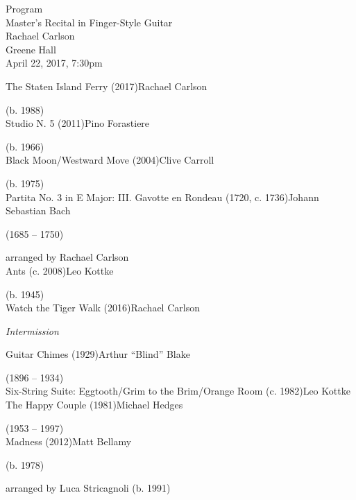 \documentclass{tufte-handout}
\begin{document}
\begin{fullwidth}
\begin{center}
  Program\\
  Master's Recital in Finger-Style Guitar\\
  Rachael Carlson\\
  Greene Hall\\
  April 22, 2017, 7:30pm
\end{center}
\noindent The Staten Island Ferry (2017)\dotfill Rachael Carlson\\
\strut\hfill (b. 1988)\\

\noindent Studio N. 5 (2011)\dotfill Pino Forastiere\\
\strut\hfill (b. 1966)\\

\noindent Black Moon/Westward Move (2004)\dotfill Clive Carroll\\
\strut \hfill (b. 1975)\\

\noindent Partita No. 3 in E Major: III. Gavotte en Rondeau (1720, c. 1736)\dotfill Johann Sebastian Bach\\
\strut \hfill (1685 -- 1750)\\
\strut\hfill arranged by Rachael Carlson\\

\noindent Ants (c. 2008)\dotfill Leo Kottke\\
\strut\hfill (b. 1945)\\

\noindent Watch the Tiger Walk (2016)\dotfill Rachael Carlson\\

\begin{center}
  \emph{Intermission}
\end{center}

\noindent Guitar Chimes (1929)\dotfill Arthur ``Blind'' Blake\\
\strut\hfill (1896 -- 1934)\\

\noindent Six-String Suite: Eggtooth/Grim to the Brim/Orange Room (c. 1982)\dotfill Leo Kottke\\

\noindent The Happy Couple (1981)\dotfill Michael Hedges\\
\strut\hfill (1953 -- 1997)\\

\noindent Madness (2012)\dotfill Matt Bellamy\\
\strut\hfill (b. 1978)\\
\strut\hfill arranged by Luca Stricagnoli (b. 1991)\\
\end{fullwidth}
\end{document}
